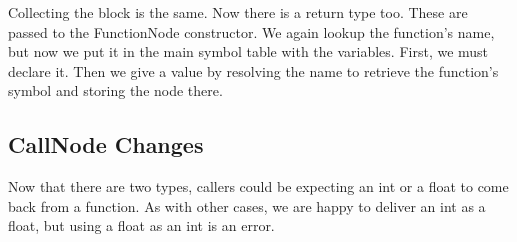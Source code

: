 Collecting the block is the same. Now there is a return type too. These are
passed to the FunctionNode constructor. We again lookup the function's name,
but now we put it in the main symbol table with the variables. First, we must
declare it. Then we give a value by resolving the name to retrieve the
function's symbol and storing the node there.

\subsection{CallNode Changes}

Now that there are two types, callers could be expecting an int or a float
to come back from a function. As with other cases, we are happy to deliver
an int as a float, but using a float as an int is an error.

